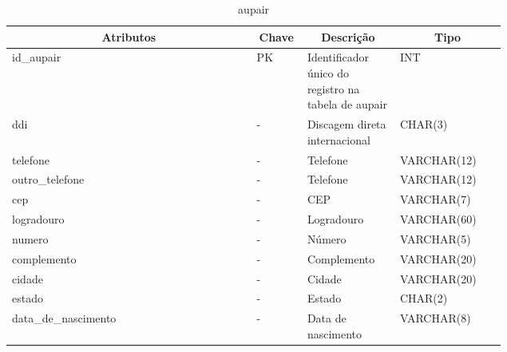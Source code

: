 \begin{enumerate}
    \begin{table}[H]
    \caption{aupair}
    \label{idioma}
    	\centering\footnotesize
        \begin{tabular}{|p{0.40\linewidth} | p{0.04\linewidth} |  p{0.12\linewidth} | p{0.16\linewidth} |}  \hline
        \multicolumn{1}{|c|}{\textbf{Atributos}} &
        \multicolumn{1}{|c|}{\textbf{Chave}} &
        \multicolumn{1}{c|}{\textbf{Descrição}} &
        \multicolumn{1}{c|}{\textbf{Tipo}} \\ \hline
          
        id\_aupair  &  
        PK & 
        Identificador único do registro na tabela de aupair &
        INT
        \\  \hline
        
        ddi  &  
        - & 
        Discagem direta internacional &
        CHAR(3)
        \\  \hline
        
        telefone  &  
        - & 
        Telefone &
        VARCHAR(12)
        \\  \hline
        
        outro\_telefone  &  
        - & 
        Telefone &
        VARCHAR(12)
        \\  \hline
        
        cep  &  
        - & 
        CEP &
        VARCHAR(7)
        \\  \hline
        
        logradouro  &  
        - & 
        Logradouro &
        VARCHAR(60)
        \\  \hline
        
        numero  &  
        - & 
        Número &
        VARCHAR(5)
        \\  \hline
        
        complemento  &  
        - & 
        Complemento &
        VARCHAR(20)
        \\  \hline
        
        cidade  &  
        - & 
        Cidade &
        VARCHAR(20)
        \\  \hline
        
        estado  &  
        - & 
        Estado &
        CHAR(2)
        \\  \hline
        
        data\_de\_nascimento  &  
        - & 
        Data de nascimento &
        VARCHAR(8)
        \\  \hline
        

\end{tabular}
\end{table}
\end{enumerate}
